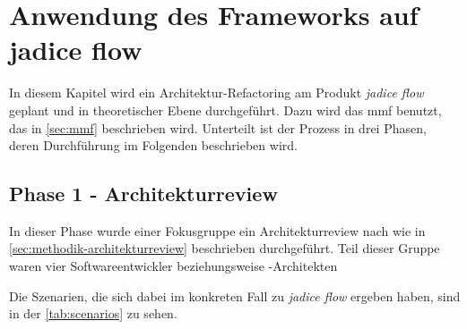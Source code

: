 \chapter{Anwendung des Frameworks auf jadice flow}
\label{chap:anwendung}

In diesem Kapitel wird ein Architektur-Refactoring am Produkt \emph{jadice flow} geplant und in theoretischer Ebene durchgeführt.
Dazu wird das \gls{mmf} benutzt, das in \cref{sec:mmf} beschrieben wird.
Unterteilt ist der Prozess in drei Phasen, deren Durchführung im Folgenden beschrieben wird.

\section{Phase 1 - Architekturreview}

In dieser Phase wurde einer Fokusgruppe ein Architekturreview nach  wie in \cref{sec:methodik-architekturreview} beschrieben durchgeführt.
Teil dieser Gruppe waren vier Softwareentwickler beziehungsweise -Architekten 

Die Szenarien, die sich dabei im konkreten Fall zu \emph{jadice flow} ergeben haben, sind in der \cref{tab:scenarios} zu sehen.

